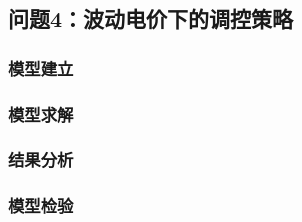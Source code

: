 \subsection{问题4：波动电价下的调控策略}
\subsubsection{模型建立}

\subsubsection{模型求解}

\subsubsection{结果分析}

\subsubsection{模型检验}

